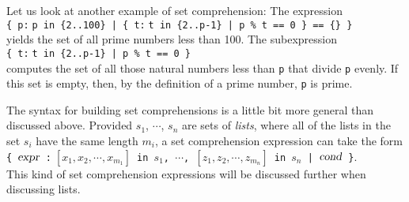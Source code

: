 Let us look at another example of set comprehension:  The expression
\\[0.2cm]
\hspace*{1.3cm}
\texttt{\{ p:$\;$p in \{2..100\} | \{ t:$\;$t in \{2..p-1\} | p \% t == 0 \} == \{\} \}}
\\[0.2cm]
yields the set of all prime numbers less than 100.  The subexpression
\\[0.2cm]
\hspace*{1.3cm}
\texttt{\{ t:$\;$t in \{2..p-1\} | p \% t == 0 \}}
\\[0.2cm]
computes the set of all those natural numbers less than \texttt{p} that divide
\texttt{p} evenly.  If this set is empty, then, by the definition of a prime number, \texttt{p} is prime.

The syntax for building set comprehensions is a little bit more
general than discussed above.  Provided $s_1$, $\cdots$, $s_n$ are sets of \emph{lists},
where all of the lists in the set $s_i$ have the same length $m_i$, a set comprehension expression
can take the form
\\[0.2cm]
\hspace*{1.3cm}
\texttt{\{ $\textsl{expr}$ :$\;[x_1,x_2,\cdots,x_{m_1}]$ in $s_1$, $\cdots$, $[z_1,z_2,\cdots, z_{m_n}]$ in $s_n$ | $\textsl{cond}$ \}}.
\\[0.2cm]
This kind of set comprehension expressions will be discussed further when discussing lists.


